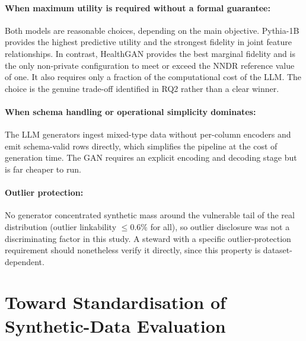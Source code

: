 \paragraph{When maximum utility is required without a formal guarantee:}
Both models are reasonable choices, depending on the main objective.
Pythia-1B provides the highest predictive utility and the strongest
fidelity in joint feature relationships. In contrast, HealthGAN provides
the best marginal fidelity and is the only non-private configuration to
meet or exceed the NNDR reference value of one. It also requires only a
fraction of the computational cost of the LLM.
The choice is the genuine trade-off identified in RQ2 rather than a clear
winner.

\paragraph{When schema handling or operational simplicity dominates:}
The LLM generators ingest mixed-type data without per-column encoders and
emit schema-valid rows directly, which simplifies the pipeline at the cost
of generation time. The GAN requires an explicit encoding and decoding stage
but is far cheaper to run.

\paragraph{Outlier protection:}
No generator concentrated synthetic mass around the vulnerable tail of the
real distribution (outlier linkability $\leq 0.6\%$ for all), so outlier
disclosure was not a discriminating factor in this study. A steward with a
specific outlier-protection requirement should nonetheless verify it
directly, since this property is dataset-dependent.

\section{Toward Standardisation of Synthetic-Data Evaluation}
\label{sec:discussion:standardisation}

